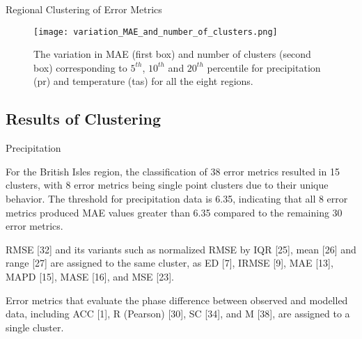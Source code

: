 \documentclass[xcolor={dvipsnames}]{beamer}
\begin{document}
\begin{frame}{Regional Clustering of Error Metrics}

\begin{figure}
    \centering
    \texttt{[image: variation\_MAE\_and\_number\_of\_clusters.png]}
    \captionsetup{font=scriptsize} 
    \caption{The variation in MAE (first box) and number of clusters (second box) corresponding to $5^{th}$, $10^{th}$ and $20^{th}$ percentile for precipitation (pr) and temperature (tas) for all the eight regions.}
    \label{fig:average_distance}
\end{figure}
    
\end{frame}

\subsection{Results of Clustering}

\begin{frame}{Precipitation}

For the British Isles region, the classification of 38 error metrics resulted in 15 clusters, with 8 error metrics being single point clusters due to their unique behavior. The threshold for precipitation data is 6.35, indicating that all 8 error metrics produced MAE values greater than 6.35 compared to the remaining 30 error metrics.

\hfill
\pause

RMSE [32] and its variants such as normalized RMSE by IQR [25], mean [26] and range [27] are assigned to the same cluster, as ED [7], IRMSE [9], MAE [13], MAPD [15], MASE [16], and MSE [23].

\hfill
\pause

Error metrics that evaluate the phase difference between observed and modelled data, including ACC [1], R (Pearson) [30], SC [34], and M [38], are assigned to a single cluster.

\end{frame}
\end{document}
